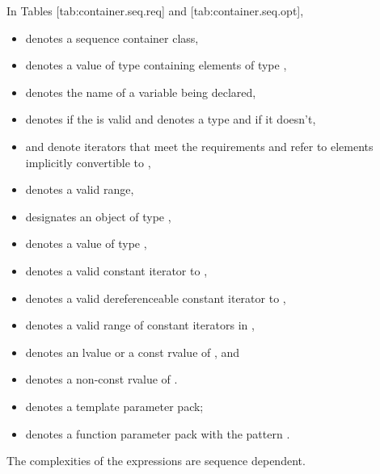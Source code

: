 \documentclass{wg21}
\begin{document}
In Tables [tab:container.seq.req]
and [tab:container.seq.opt],
\begin{itemize}
    \item
     denotes a sequence container class,
    \item
     denotes a value of type  containing elements of type ,
    \item
     denotes the name of a variable being declared,
    \item
     denotes  if
    the   is valid and denotes a
    type and
     if it doesn't,
    \item
     and 
    denote iterators that meet the  requirements
    and refer to elements implicitly convertible to ,
    \item
    \tcode{[i, j)} denotes a valid range,
    \item
     designates an object of type ,
    \item
     denotes a value of type ,
    \item
     denotes a valid constant iterator to ,
    \item
     denotes a valid dereferenceable constant iterator to ,
    \item
    \tcode{[q1, q2)} denotes a valid range of constant iterators in ,
    \item
     denotes an lvalue or a const rvalue of , and
    \item
     denotes a non-const rvalue of .
    \item
     denotes a template parameter pack;
    \item
     denotes a function parameter pack with the pattern .
\end{itemize}

\pnum
The complexities of the expressions are sequence dependent.
\end{document}
